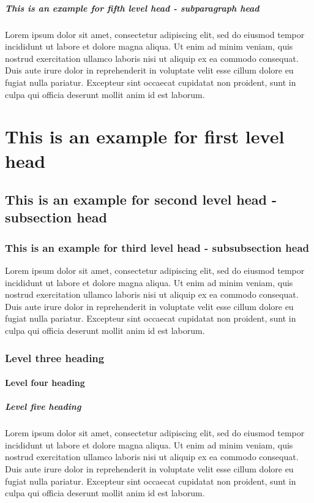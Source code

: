 \documentclass[unnumsec,webpdf,modern,large]{oup-authoring-template}
\theoremstyle{thmstyleone}%
\theoremstyle{thmstyletwo}%
\theoremstyle{thmstylethree}%
\begin{document}
\subparagraph{This is an example for fifth level head - subparagraph head}

Lorem ipsum dolor sit amet, consectetur adipiscing elit, sed do eiusmod tempor incididunt ut labore et dolore magna aliqua. Ut enim ad minim veniam, quis nostrud exercitation ullamco laboris nisi ut aliquip ex ea commodo consequat. Duis aute irure dolor in reprehenderit in voluptate velit esse cillum dolore eu fugiat nulla pariatur. Excepteur sint occaecat cupidatat non proident, sunt in culpa qui officia deserunt mollit anim id est laborum.

\section{This is an example for first level head}\label{sec3}

\subsection{This is an example for second level head - subsection head}\label{subsec2}

\subsubsection{This is an example for third level head - subsubsection head}\label{subsubsec2}

Lorem ipsum dolor sit amet, consectetur adipiscing elit, sed do eiusmod tempor incididunt ut labore et dolore magna aliqua. Ut enim ad minim veniam, quis nostrud exercitation ullamco laboris nisi ut aliquip ex ea commodo consequat. Duis aute irure dolor in reprehenderit in voluptate velit esse cillum dolore eu fugiat nulla pariatur. Excepteur sint occaecat cupidatat non proident, sunt in culpa qui officia deserunt mollit anim id est laborum.

\subsubsection{Level three heading}

\paragraph{Level four heading}

\subparagraph{Level five heading}

Lorem ipsum dolor sit amet, consectetur adipiscing elit, sed do eiusmod tempor incididunt ut labore et dolore magna aliqua. Ut enim ad minim veniam, quis nostrud exercitation ullamco laboris nisi ut aliquip ex ea commodo consequat. Duis aute irure dolor in reprehenderit in voluptate velit esse cillum dolore eu fugiat nulla pariatur. Excepteur sint occaecat cupidatat non proident, sunt in culpa qui officia deserunt mollit anim id est laborum.
\end{document}
